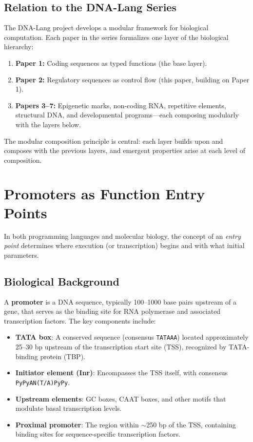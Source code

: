 \documentclass[12pt,a4paper]{article}
\begin{document}
\subsection{Relation to the DNA-Lang Series}

The DNA-Lang project develops a modular framework for biological computation.  Each paper in the series formalizes one layer of the biological hierarchy:

\begin{enumerate}
  \item \textbf{Paper 1:} Coding sequences as typed functions (the base layer).
  \item \textbf{Paper 2:} Regulatory sequences as control flow (this paper, building on Paper 1).
  \item \textbf{Papers 3--7:} Epigenetic marks, non-coding RNA, repetitive elements, structural DNA, and developmental programs---each composing modularly with the layers below.
\end{enumerate}

The modular composition principle is central: each layer builds upon and composes with the previous layers, and emergent properties arise at each level of composition.


\section{Promoters as Function Entry Points}\label{sec:promoters}

In both programming languages and molecular biology, the concept of an \emph{entry point} determines where execution (or transcription) begins and with what initial parameters.

\subsection{Biological Background}

A \textbf{promoter} is a DNA sequence, typically 100--1000 base pairs upstream of a gene, that serves as the binding site for RNA polymerase and associated transcription factors.  The key components include:

\begin{itemize}
  \item \textbf{TATA box}: A conserved sequence (consensus \texttt{TATAAA}) located approximately 25--30 bp upstream of the transcription start site (TSS), recognized by TATA-binding protein (TBP).
  \item \textbf{Initiator element (Inr)}: Encompasses the TSS itself, with consensus \texttt{PyPyAN(T/A)PyPy}.
  \item \textbf{Upstream elements}: GC boxes, CAAT boxes, and other motifs that modulate basal transcription levels.
  \item \textbf{Proximal promoter}: The region within $\sim$250 bp of the TSS, containing binding sites for sequence-specific transcription factors.
\end{itemize}
\end{document}
